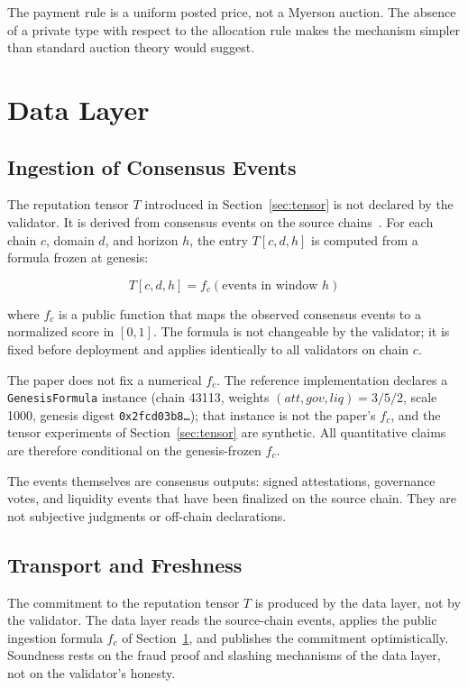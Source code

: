 \documentclass[11pt,a4paper]{article}
\numberwithin{equation}{section}
\numberwithin{table}{section}
\begin{document}
The payment rule is a uniform posted price, not a Myerson auction. The absence of a private type with respect to the allocation rule makes the mechanism simpler than standard auction theory would suggest.

\section{Data Layer}
\label{sec:datalayer}

\subsection{Ingestion of Consensus Events}
The reputation tensor $T$ introduced in Section~\ref{sec:tensor} is not declared by the validator. It is derived from consensus events on the source chains~\cite{saleh2021}. For each chain $c$, domain $d$, and horizon $h$, the entry $T[c,d,h]$ is computed from a formula frozen at genesis:

\begin{equation}
T[c,d,h] = f_c(\text{events in window } h)
\label{eq:ingestion}
\end{equation}

where $f_c$ is a public function that maps the observed consensus events to a normalized score in $[0,1]$. The formula is not changeable by the validator; it is fixed before deployment and applies identically to all validators on chain $c$.

The paper does not fix a numerical $f_c$. The reference implementation declares a \texttt{GenesisFormula} instance (chain 43113, weights $(att, gov, liq) = 3/5/2$, scale 1000, genesis digest \texttt{0x2fcd03b8\ldots}); that instance is not the paper's $f_c$, and the tensor experiments of Section~\ref{sec:tensor} are synthetic. All quantitative claims are therefore conditional on the genesis-frozen $f_c$.

The events themselves are consensus outputs: signed attestations, governance votes, and liquidity events that have been finalized on the source chain. They are not subjective judgments or off-chain declarations.

\subsection{Transport and Freshness}
The commitment to the reputation tensor $T$ is produced by the data layer, not by the validator. The data layer reads the source-chain events, applies the public ingestion formula $f_c$ of Section~\ref{sec:datalayer}, and publishes the commitment optimistically. Soundness rests on the fraud proof and slashing mechanisms of the data layer, not on the validator's honesty.
\end{document}
